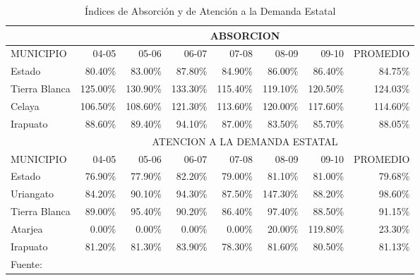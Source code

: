 \begin{table}
	\centering
    \caption{\'Indices de Absorci\'on y de Atenci\'on a la Demanda Estatal}
    \label{tbl:SEG:AbsorcionYDemandaEstatal}
    \footnotesize
    \begin{tabular}{l||r|r|r|r|r|r||r}
        \hline
        \hline
                      & \multicolumn{7}{|c}{ABSORCION}                                                  \\
        \hline
        MUNICIPIO     & 04-05     & 05-06     & 06-07     & 07-08     & 08-09     & 09-10     & PROMEDIO \\
        \hline
        Estado        &  80.40\%  &  83.00\%  &  87.80\%  &  84.90\%  &  86.00\%  &  86.40\%  &  84.75\% \\
        Tierra Blanca & 125.00\%  & 130.90\%  & 133.30\%  & 115.40\%  & 119.10\%  & 120.50\%  & 124.03\% \\
        Celaya        & 106.50\%  & 108.60\%  & 121.30\%  & 113.60\%  & 120.00\%  & 117.60\%  & 114.60\% \\
        Irapuato      &  88.60\%  &  89.40\%  &  94.10\%  &  87.00\%  &  83.50\%  &  85.70\%  &  88.05\% \\
        \hline
        \hline
                      & \multicolumn{7}{|c}{ATENCION A LA DEMANDA ESTATAL}                    \\
        \hline
        MUNICIPIO     & 04-05   & 05-06   & 06-07   & 07-08   & 08-09    & 09-10    & PROMEDIO \\
        \hline
        Estado        & 76.90\% & 77.90\% & 82.20\% & 79.00\% &  81.10\% &  81.00\% & 79.68\%  \\
        Uriangato     & 84.20\% & 90.10\% & 94.30\% & 87.50\% & 147.30\% &  88.20\% & 98.60\%  \\
        Tierra Blanca & 89.00\% & 95.40\% & 90.20\% & 86.40\% &  97.40\% &  88.50\% & 91.15\%  \\
        Atarjea       &  0.00\% &  0.00\% &  0.00\% &  0.00\% &  20.00\% & 119.80\% & 23.30\%  \\
        Irapuato      & 81.20\% & 81.30\% & 83.90\% & 78.30\% &  81.60\% &  80.50\% & 81.13\%  \\
        \hline
        \multicolumn{8}{l}{Fuente: \citep{Seg2010}}
    \end{tabular}
\end{table}
